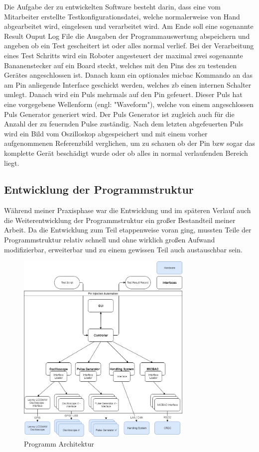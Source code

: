 Die Aufgabe der zu entwickelten Software besteht darin, dass eine vom Mitarbeiter erstellte
Testkonfigurationsdatei, welche normalerweise von Hand abgearbeitet wird, eingelesen und
verarbeitet wird. Am Ende soll eine sogenannte Result Ouput Log File die Ausgaben der
Programmauswertung abspeichern und angeben ob ein Test gescheitert ist oder alles normal
verlief.
Bei der Verarbeitung eines Test Schritts wird ein Roboter angesteuert der maximal zwei
sogenannte Bananenstecker auf ein Board steckt, welches mit den Pins des zu testenden Gerätes
angeschlossen ist. Danach kann ein optionales \ac{micbac} Kommando an das am Pin anliegende
Interface geschickt werden, welches \ac{zb} einen internen Schalter umlegt. Danach wird ein
Puls mehrmals auf den Pin gefeuert. Dieser Puls hat eine vorgegebene Wellenform (engl:
"Waveform"), welche von einem angeschlossen Puls Generator generiert wird. Der Puls Generator
ist zugleich auch für die Anzahl der zu feuernden Pulse zuständig. Nach dem letzten
abgefeuerten Puls wird ein Bild vom Oszilloskop abgespeichert und mit einem vorher
aufgenommenen Referenzbild verglichen, um zu schauen ob der Pin \ac{bzw} sogar das komplette
Gerät beschädigt wurde oder ob alles in normal verlaufenden Bereich liegt. 


\subsection{Entwicklung der Programmstruktur}
\label{subsec:entw-prgstr}

Während meiner Praxisphase war die Entwicklung und im späteren Verlauf auch die
Weiterentwicklung der Programmstruktur ein großer Bestandteil meiner Arbeit. Da die Entwicklung
zum Teil etappenweise voran ging, mussten Teile der Programmstruktur relativ schnell und ohne
wirklich großen Aufwand modifizierbar, erweiterbar und zu einem gewissen Teil auch austauschbar
sein. 

\begin{figure}[H]
	\centering
	\includegraphics[width=0.75\textwidth, height=0.75\textwidth]{graphics/program_architecture.png}
	\caption{Programm Architektur}
	\label{fig:prg_architecture}
\end{figure}

